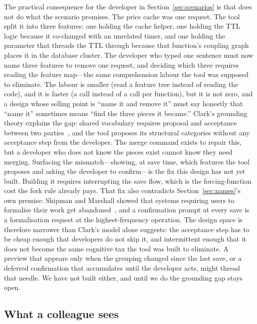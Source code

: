 The practical consequence for the developer in Section~\ref{sec:scenarios} is
that  does not do what the scenario promises. The
price cache was one request. The tool split it into three features: one holding
the cache helper, one holding the TTL logic because it co-changed with an
unrelated timer, and one holding the parameter that threads the TTL through
 because that function's coupling graph places it in the
database cluster. The developer who typed one sentence must now name three
features to remove one request, and deciding which three requires reading the
feature map---the same comprehension labour the tool was supposed to eliminate.
The labour is smaller (read a feature tree instead of reading the code), and it
is faster (a  call instead of a  call per
function), but it is not zero, and a design whose selling point is ``name it and
remove it'' must say honestly that ``name it'' sometimes means ``find the three
pieces it became.'' Clark's grounding theory explains the gap: shared vocabulary
requires proposal and acceptance between two
parties~\cite{clark1996}, and the tool proposes its structural
categories without any acceptance step from the developer. The merge command
exists to repair this, but a developer who does not know the pieces exist cannot
know they need merging. Surfacing the mismatch---showing, at save time, which
features the tool proposes and asking the developer to confirm---is the fix this
design has not yet built. Building it requires interrupting the save flow,
which is the forcing-function cost the fork rule already pays. That fix also
contradicts Section~\ref{sec:names}'s own premise: Shipman and Marshall showed
that systems requiring users to formalise their work get
abandoned~\cite{shipman1999}, and a confirmation prompt at every save is a
formalisation request at the highest-frequency operation. The design space is
therefore narrower than Clark's model alone suggests: the acceptance step has to
be cheap enough that developers do not skip it, and intermittent enough that it
does not become the same cognitive tax the tool was built to eliminate. A preview
that appears only when the grouping changed since the last save, or a deferred
confirmation that accumulates until the developer acts, might thread that needle.
We have not built either, and until we do the grounding gap stays open.

\subsection{What a colleague sees}
\label{sec:colleague}

